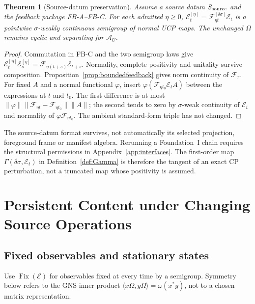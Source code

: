 \documentclass[12pt]{article}
\newtheorem{theorem}{Theorem}[section]
\theoremstyle{definition}
\theoremstyle{remark}
\begin{document}
\begin{theorem}[Source-datum preservation]\label{thm:preserve}
Assume a source datum $S_{\rm source}$ and the feedback package
FB-A--FB-C. For each admitted $\eta\ge0$,
$\mathcal E_t^{[\eta]}=\mathscr F_{\eta t}^{[\delta\sigma]}\mathcal E_t$
is a pointwise $\sigma$-weakly continuous semigroup of normal UCP
maps. The unchanged $\Omega$ remains cyclic and separating for
$\mathcal A_U$.
\end{theorem}
\begin{proof}
Commutation in FB-C and the two semigroup laws give
$\mathcal E_t^{[\eta]}\mathcal E_s^{[\eta]}
=\mathscr F_{\eta(t+s)}\mathcal E_{t+s}$.
Normality, complete positivity and unitality survive composition.
Proposition~\ref{prop:boundedfeedback} gives norm continuity of
$\mathscr F_r$. For fixed $A$ and a normal functional $\varphi$, insert
$\varphi(\mathscr F_{\eta t_0}\mathcal E_t A)$ between the expressions
at $t$ and $t_0$. The first difference is at most
$\|\varphi\|\|\mathscr F_{\eta t}-\mathscr F_{\eta t_0}\|\|A\|$;
the second tends to zero by $\sigma$-weak continuity of $\mathcal E_t$
and normality of $\varphi\mathscr F_{\eta t_0}$.
The ambient standard-form triple has not changed.
\end{proof}

The source-datum format survives, not automatically its selected
projection, foreground frame or manifest algebra. Rerunning a
Foundation~I chain requires the structural permissions in
Appendix~\ref{app:interfaces}.
The first-order map $\Gamma(\delta\sigma,\mathcal E_t)$ in
Definition~\ref{def:Gamma} is therefore the tangent of an exact
CP perturbation, not a truncated map whose positivity is assumed.

\section{Persistent Content under Changing Source Operations}\label{sec:persistence}

\subsection{Fixed observables and stationary states}

Use \(\operatorname{Fix}(\mathcal E)\) for observables fixed at every
time by a semigroup. Symmetry below refers to the GNS inner product
\(\langle x\Omega,y\Omega\rangle=\omega(x^*y)\), not to a chosen
matrix representation.
\end{document}
